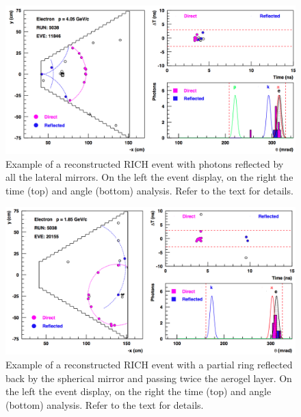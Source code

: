\documentclass[5p,times,twocolumn]{elsarticle}
\begin{document}
\begin{figure}[t]
\begin{center}
\includegraphics[width=0.9\columnwidth]{Event_11846.png}
\end{center}
\caption{Example of a reconstructed RICH event with photons reflected by all the lateral mirrors. On the left the event display, on the right the time (top) and angle (bottom) analysis. Refer to the text for details.} 
\label{Fig:Event3}
\end{figure}

\begin{figure}[t]
\begin{center}
\includegraphics[width=0.9\columnwidth]{Event_20155.png}
\end{center}
\caption{Example of a reconstructed RICH event with a partial ring reflected back by the spherical mirror and passing twice the aerogel layer. On the left the event display, on the right the time (top) and angle (bottom) analysis. Refer to the text for details.}
\label{Fig:Event4}
\end{figure}

\twocolumn
\end{document}
